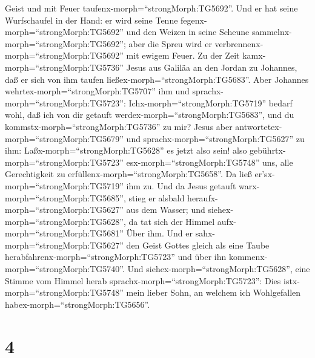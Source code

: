 Geist und mit Feuer taufenx-morph=``strongMorph:TG5692''. 
Und er hat seine Wurfschaufel in der Hand: er wird seine Tenne
fegenx-morph=``strongMorph:TG5692'' und den Weizen in seine Scheune
sammelnx-morph=``strongMorph:TG5692''; aber die Spreu wird er
verbrennenx-morph=``strongMorph:TG5692'' mit ewigem Feuer. 
Zu der Zeit kamx-morph=``strongMorph:TG5736'' Jesus aus Galiläa an den
Jordan zu Johannes, daß er sich von ihm taufen
ließex-morph=``strongMorph:TG5683''.  Aber Johannes
wehrtex-morph=``strongMorph:TG5707'' ihm und
sprachx-morph=``strongMorph:TG5723'': Ichx-morph=``strongMorph:TG5719''
bedarf wohl, daß ich von dir getauft
werdex-morph=``strongMorph:TG5683'', und du
kommstx-morph=``strongMorph:TG5736'' zu mir?  Jesus aber
antwortetex-morph=``strongMorph:TG5679'' und
sprachx-morph=``strongMorph:TG5627'' zu ihm:
Laßx-morph=``strongMorph:TG5628'' es jetzt also sein! also
gebührtx-morph=``strongMorph:TG5723'' esx-morph=``strongMorph:TG5748''
uns, alle Gerechtigkeit zu erfüllenx-morph=``strongMorph:TG5658''. Da
ließ er'sx-morph=``strongMorph:TG5719'' ihm zu.  Und da
Jesus getauft warx-morph=``strongMorph:TG5685'', stieg er alsbald
heraufx-morph=``strongMorph:TG5627'' aus dem Wasser; und
siehex-morph=``strongMorph:TG5628'', da tat sich der Himmel
aufx-morph=``strongMorph:TG5681'' Über ihm. Und er
sahx-morph=``strongMorph:TG5627'' den Geist Gottes gleich als eine Taube
herabfahrenx-morph=``strongMorph:TG5723'' und über ihn
kommenx-morph=``strongMorph:TG5740''.  Und
siehex-morph=``strongMorph:TG5628'', eine Stimme vom Himmel herab
sprachx-morph=``strongMorph:TG5723'': Dies
istx-morph=``strongMorph:TG5748'' mein lieber Sohn, an welchem ich
Wohlgefallen habex-morph=``strongMorph:TG5656''.

\hypertarget{section-3}{%
\section{4}\label{section-3}}

